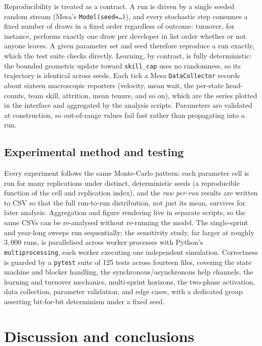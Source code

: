 \documentclass[11pt,a4paper]{article}
\begin{document}
Reproducibility is treated as a contract. A run is driven by a single seeded random stream (Mesa's
\texttt{Model(seed=\ldots)}), and every stochastic step consumes a fixed number of draws in a fixed
order regardless of outcome: turnover, for instance, performs exactly one draw per developer in list
order whether or not anyone leaves. A given parameter set and seed therefore reproduce a run exactly,
which the test suite checks directly. Learning, by contrast, is fully deterministic: the bounded
geometric update toward \texttt{skill\_cap} uses no randomness, so its trajectory is identical across
seeds. Each tick a Mesa \texttt{DataCollector} records about sixteen macroscopic reporters (velocity,
mean wait, the per-state head-counts, team skill, attrition, mean tenure, and so on), which are the
series plotted in the interface and aggregated by the analysis scripts. Parameters are validated at
construction, so out-of-range values fail fast rather than propagating into a run.

\subsection{Experimental method and testing}

Every experiment follows the same Monte-Carlo pattern: each parameter cell is run for many
replications under distinct, deterministic seeds (a reproducible function of the cell and replication
index), and the \emph{raw per-run} results are written to CSV so that the full run-to-run
distribution, not just its mean, survives for later analysis. Aggregation and figure rendering live
in separate scripts, so the same CSVs can be re-analysed without re-running the model. The
single-sprint and year-long sweeps run sequentially; the sensitivity study, far larger at roughly
$3{,}000$ runs, is parallelised across worker processes with Python's \texttt{multiprocessing}, each
worker executing one independent simulation. Correctness is guarded by a \texttt{pytest} suite of 125
tests across fourteen files, covering the state machine and blocker handling, the
synchronous/asynchronous help channels, the learning and turnover mechanics, multi-sprint horizons,
the two-phase activation, data collection, parameter validation, and edge cases, with a dedicated
group asserting bit-for-bit determinism under a fixed seed.

\section{Discussion and conclusions}
\label{sec:disc}
\end{document}
